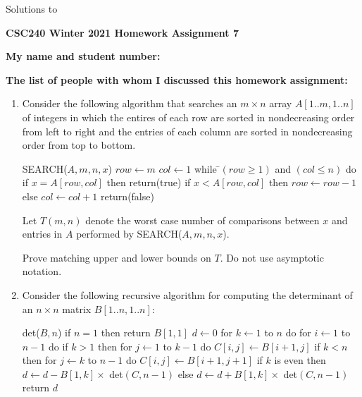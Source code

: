 \documentclass[11pt]{article}
\begin{document}
\begin{center}
\begin{solution}
Solutions to
\end{solution}

{\bf \Large \bf CSC240 Winter 2021 Homework Assignment 7}\\
\end{center}

\noindent
{\bf My name and student number:}

\medskip

\noindent
{\bf The list of people with whom I discussed this homework assignment:}

\medskip

\begin{enumerate}
\item
\begin{question}
Consider the following algorithm that searches an $m \times n$ array $A[1..m,1..n]$ of integers in which the entires of each row are sorted in nondecreasing order from left to right and the entries of each column are sorted in nondecreasing order from top to bottom.

\begin{formal}
SEARCH($A,m,n,x$)\nl
$row \leftarrow m$\nl
$col \leftarrow 1$\nl
while \=$(row \geq 1)$ and $(col \leq n)$ do\nl
\n if $x = A[row,col]$ then return(true)\nl
if $x < A[row,col]$\nl
then $row \leftarrow  row -1$\nl
else $col \leftarrow  col +1$\nl
\p return(false)
\end{formal}

Let $T(m,n)$ denote the worst case number of comparisons between $x$ and entries in
$A$ performed by SEARCH($A,m,n,x$).

Prove  matching upper and lower bounds on $T$. Do not use asymptotic notation.
\end{question}

\item
\begin{question}
Consider the following recursive algorithm for computing the determinant of an $n \times n$ matrix $B[1..n,1..n]$:

\setcounter{linenum}{0} 

\begin{formal}
det($B,n$)\nl
if $n =1$ then return $B[1,1]$\nl
$d \leftarrow 0$\nl
for $k \leftarrow 1$ to $n$ do\nl
\n for $i \leftarrow 1$ to $n-1$ do\nl
\n if $k > 1$ then\nl
\n for $j \leftarrow 1$ to $k-1$ do\nl
\n $C[i,j] \leftarrow B[i+1,j]$\nl
\p\p if $k < n$ then\nl
\n for $j \leftarrow k$ to $n-1$ do\nl
\n $C[i,j] \leftarrow B[i+1,j+1]$\nl
\p\p\p if $k$ is even\nl
then $d \leftarrow d - B[1,k] \times$ det$(C,n-1)$\nl
else $d \leftarrow d + B[1,k] \times$ det$(C,n-1)$\nl
\p return $d$
\end{formal}


\end{question}
\end{enumerate}
\end{document}
